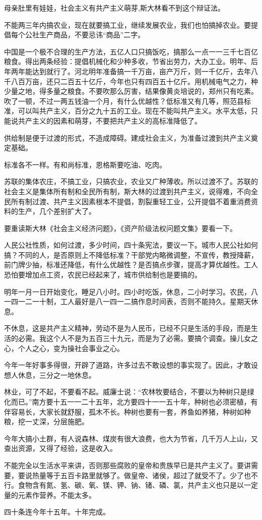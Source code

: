 母亲肚里有娃娃，社会主义有共产主义萌芽,斯大林看不到这个辩证法。

不能两三年内搞农业，现在就要搞工业，继续发展农业，我们也怕搞掉农业。要提倡每个公社生产商品，不要忌讳“商品”二字。

中国是一个极不合理的生产方法，五亿人口只搞饭吃，搞那么一点一一三千七百亿粮食。得出两条经验：提倡机械化和少种多收，节省出劳力，大办工业。明年、后年两年能达到就行了。河北明年准备搞一千万亩，亩产万斤，则一千亿斤，去年八千八百万亩，还只二百五十亿斤，今年也只有四百五十亿斤。用机械电气之力，种少量之地，得多量之粮食。不要吹那么厉害，结果像黄炎培说的，郑州只有吃素。吹了一顿，不过一两五钱油一个月，有什么优越性？低标准又有几等，照范县标准，可以叫共产主义，百分之九十五的工业。现在不能叫共产主义。水平太低，只能说共产主义的因素和萌芽，不要把共产主义的高标准降低了。

供给制是便于过渡的形式，不造成障碍。建成社会主义，为准备过渡到共产主义奠定基础。

标准各不一样。有和尚标准，恩格斯要吃油、吃肉。

苏联的集体农庄，不搞工业，只搞农业，农业又广种薄收。所以过渡不了。苏联的社会主义是集体所有制和全民所有制，斯大林的过渡到共产主义，说得难，不向全民所有制过渡、共产主义因素根本不提倡，割裂重轻工业，公开提倡不着重消费资料的生产，几个差别扩大了。

要重读斯大林《社会主义经济问题》，《资产阶级法权问题文集》要看一下。

人民公社性质，如何过渡，多少时间，四十条宪法，要议一下。城市人民公社如何搞？不同的人，是否原则上不降低标准？干部党内略微调整，不宣传，教授降薪，前门牌少抽，标准还降低，有什么优越性？是否搞点步骤，提高才算优越性。工人恐怕要增加点工资，农民已经起来了，城市供给制也是要搞的。

明年一月一日开始变化，睡足八小时。四小时吃饭，休息，二小时学习。农民，八一四一二一十制，工人最好是八一四一二搞作息时间表，否则不能持久。星期天休息。

不休息，这是共产主义精神，劳动不是为人民币，已经不只是生活的手段，而是生活的必需。我这个人不是为五百三十九元，而是为了必需。要搞个调查。操儿女之心，个人之心，变为操社会事业之心。

今年一年好事多得很，开辟了道路，许多过去不敢设想的事实现了。因此，才敢设想人休息，三分之一地休息。

林业，可了不起，不要看不起。威廉士说：“农林牧要结合，不要以为种树只是绿化而已。”南方要十五一一二十五年，北方要四十一一五十年，种树也必须密植，有伴容易长，大家长就舒服，孤木不长。种树也要有一套，养鱼如养猪，种树如种粮，挖一丈深，分层施肥。

今年大搞小土群，有人说森林、煤炭有很大浪费，也大为节省，几千万人上山，又查出资源，又得了经验，这是收入。

不能完全以生活水平来讲，否则那些腐败的皇帝和贵族早已是共产主义了。要讲需要，要说热量等于五百卡路里就够了。做皇帝、诸侯，超过了就受不了。少了也不行。食物含有氮、氢、碳、氧、镁、钾、钠、锗、磷、氯，共产主义也只是以一定量的元素作营养。不能太多。

四十条连今年十五年。十年完成。


